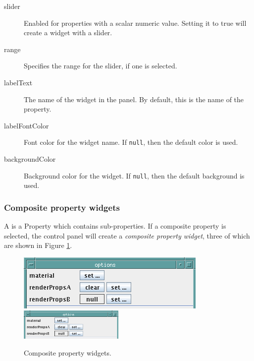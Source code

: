 \documentclass{article}
\begin{document}
\begin{description}

\item[slider]\mbox{}

Enabled for properties with a scalar numeric value.
Setting it to true will create a widget with a slider.

\item[range]\mbox{}

Specifies the range for the slider, if one is selected.

\item[labelText]\mbox{}

The name of the widget in the panel. By default, this is the
name of the property.

\item[labelFontColor]\mbox{}

Font color for the widget name. If {\tt null}, then the default color 
is used.

\item[backgroundColor]\mbox{}

Background color for the widget. If {\tt null}, then the default 
background is used.

\end{description}

\subsubsection{Composite property widgets}

A  is a Property which contains
sub-properties. If a composite property is selected, the control panel
will create a {\it composite property widget}, three of which are shown in
Figure \ref{compositePropWidgetsFig}.

\begin{figure}
\begin{center}
\iflatexml
\includegraphics[]{images/compositePropWidgets}
\else
\includegraphics[width=0.45\textwidth]{images/compositePropWidgets}
\fi
\end{center}
\caption{Composite property widgets.}%
\label{compositePropWidgetsFig}
\end{figure}
\end{document}
